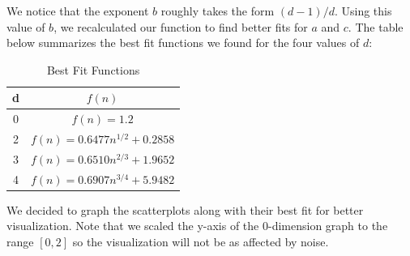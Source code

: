 \documentclass[12pt]{article}
\begin{document}
We notice that the exponent $b$ roughly takes the form $(d-1)/d$. Using this value of $b$, we recalculated our function to find better fits for $a$ and $c$. The table below summarizes the best fit functions we found for the four values of $d$:

\begin{table}[h!]
\centering
\caption{Best Fit Functions}
\renewcommand{\arraystretch}{1.3}
{\setlength{\tabcolsep}{15pt}
\begin{tabular} {c | c  }
d&$f(n)$\\ \hline
0&$f(n) = 1.2$\\
2&$f(n) = 0.6477n^{1/2} + 0.2858$\\
3&$f(n) = 0.6510n^{2/3}+1.9652$\\
4&$f(n) = 0.6907n^{3/4}+5.9482$\\
\end{tabular}}
\label{table:4}
\end{table}

We decided to graph the scatterplots along with their best fit for better visualization. Note that we scaled the y-axis of the 0-dimension graph to the range $[0, 2]$ so the visualization will not be as affected by noise. \\
\end{document}
